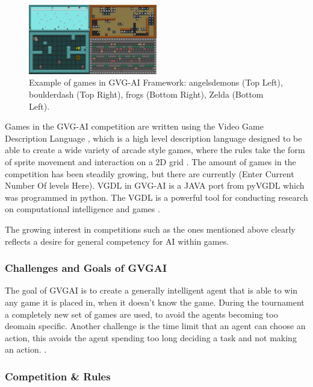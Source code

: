 \documentclass[journal]{IEEEtran}
\begin{document}
		\begin{figure}[h]
		    \centering
		    \includegraphics[width=0.5\textwidth]{VGDL2}
		    \caption{Example of games in GVG-AI Framework: angelsdemons (Top Left), boulderdash (Top Right), frogs (Bottom Right), Zelda (Bottom Left). }
		    \label{fig:VGDL}
		\end{figure}
		Games in the GVG-AI competition are written using the Video Game Description Language \cite{schaul2014extensible}, which is a high level description language designed to be able to create a wide variety of arcade style games, where the rules take the form of sprite movement and interaction on a 2D grid \cite{nelson2016investigating}.
		The amount of games in the competition has been steadily growing, but there are currently (Enter Current Number Of levels Here). VGDL in GVG-AI is a JAVA port from pyVGDL which was programmed in python. The VGDL is a powerful tool for conducting research on computational intelligence and games \cite{schaul2014extensible, love2008general}.
		
		The growing interest in competitions such as the ones mentioned above clearly reflects a desire for general competency for AI within games.

	\subsubsection{Challenges and Goals of GVGAI}
		The goal of GVGAI is to create a generally intelligent agent that is able to win any game it is placed in, when it doesn't know the game.
		During the tournament a completely new set of games are used, to avoid the agents becoming too deomain specific.
		Another challenge is the time limit that an agent can choose an action, this avoids the agent spending too long deciding a task and not making an action. \cite{schuster2015mcts}.

		
		
		
	\subsubsection{Competition \& Rules}
	
\end{document}
